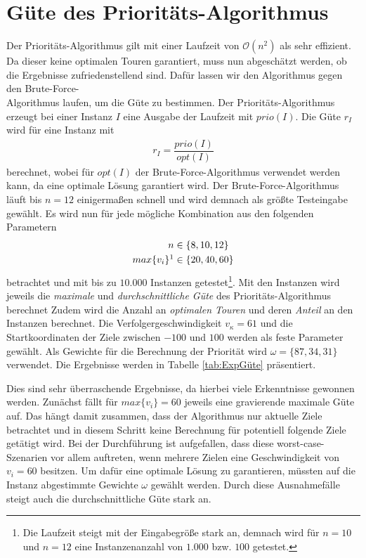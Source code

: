 \documentclass[german,version-2019-11]{uzl-thesis}
\begin{document}
\section{Güte des Prioritäts-Algorithmus}
Der Prioritäts-Algorithmus gilt mit einer Laufzeit von $\mathcal{O}(n^2)$ als sehr effizient. Da dieser keine optimalen Touren garantiert, muss nun abgeschätzt werden, ob die Ergebnisse zufriedenstellend sind. Dafür lassen wir den Algorithmus gegen den Brute-Force-\\Algorithmus laufen, um die Güte zu bestimmen. Der Prioritäts-Algorithmus erzeugt bei einer Instanz $I$ eine Ausgabe der Laufzeit mit $prio(I)$. Die Güte $r_I$ wird für eine Instanz mit
\begin{align*}
r_I = \dfrac{prio(I)}{opt(I)}
\end{align*} 
berechnet, wobei für $opt(I)$ der Brute-Force-Algorithmus verwendet werden kann, da eine optimale Lösung garantiert wird. Der Brute-Force-Algorithmus läuft bis $n=12$ einigermaßen schnell und wird demnach als größte Testeingabe gewählt. Es wird nun für jede mögliche Kombination aus den folgenden Parametern
\begin{align*}
n&\in\{8,10,12\}\\
max\{v_{i}\}\footnotemark&\in\{20,40,60\} 
\end{align*}
 betrachtet und mit bis zu $10.000$ Instanzen getestet\footnote{Die Laufzeit steigt mit der Eingabegröße stark an, demnach wird für $n=10$ und $n=12$ eine Instanzenanzahl von $1.000$ bzw. $100$ getestet.}. Mit den Instanzen wird jeweils die \emph{maximale} und \emph{durchschnittliche Güte} des Prioritäts-Algorithmus berechnet Zudem wird die Anzahl an \emph{optimalen Touren} und deren \emph{Anteil} an den Instanzen berechnet. Die Verfolgergeschwindigkeit $v_{\kappa}=61$ und die Startkoordinaten der Ziele zwischen $-100$ und $100$ werden als feste Parameter gewählt. Als Gewichte für die Berechnung der Priorität wird $\omega = \{87,34,31\}$ verwendet. Die Ergebnisse werden in Tabelle \ref{tab:ExpGüte} präsentiert.

Dies sind sehr überraschende Ergebnisse, da hierbei viele Erkenntnisse gewonnen werden. Zunächst fällt für $max\{v_i\}=60$ jeweils eine gravierende maximale Güte auf. Das hängt damit zusammen, dass der Algorithmus nur aktuelle Ziele betrachtet und in diesem Schritt keine Berechnung für potentiell folgende Ziele getätigt wird. Bei der Durchführung ist aufgefallen, dass diese worst-case-Szenarien vor allem auftreten, wenn mehrere Zielen eine Geschwindigkeit von $v_i=60$ besitzen. Um dafür eine optimale Lösung zu garantieren, müssten auf die Instanz abgestimmte Gewichte $\omega$ gewählt werden. Durch diese Ausnahmefälle steigt auch die durchschnittliche Güte stark an. 
\end{document}

